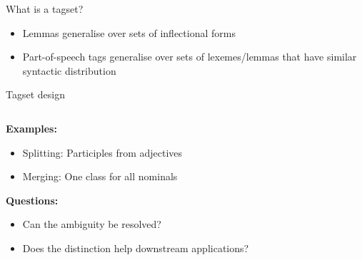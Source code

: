 \documentclass{beamer}
\begin{document}
\begin{frame}{What is a tagset?}

\begin{itemize}
  \item Lemmas generalise over sets of inflectional forms
  \item Part-of-speech tags generalise over sets of lexemes/lemmas that have 
    similar syntactic distribution
\end{itemize}

\end{frame}

\begin{frame}{Tagset design}

\begin{columns}

\begin{column}{0.6\textwidth}

\textbf{Examples:}
\begin{itemize}
  \item Splitting: Participles from adjectives 
  \item Merging:  One class for all nominals
\end{itemize}
\textbf{Questions:}
\begin{itemize}
  \item Can the ambiguity be resolved? 
  \item Does the distinction help downstream applications?
\end{itemize}


\end{column}
\end{columns}
\end{frame}
\end{document}
